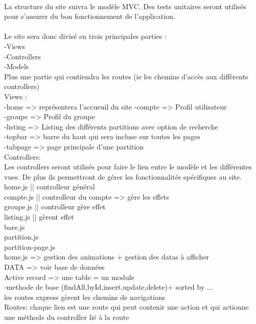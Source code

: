 \paragraph{}
La structure du site suivra le modèle MVC.
Des tests unitaires seront utilisés pour s'assurer du bon fonctionnement de l'application.
\\
\\
Le site sera donc divisé en trois principales parties : \\
-Views \\
-Controllers \\ 
-Models \\
Plus une partie qui contiendra les routes (ie les chemins d'accès aux différents controllers)
\\

Views : \\ 
-home => représentera l'accueuil du site
-compte => Profil utilisateur \\
-groupe => Profil du groupe \\
-listing => Listing des différents partitions avec option de recherche\\
-topbar => barre du haut qui sera incluse sur toutes les pages\\
-tabpage => page principale d'une partition\\

Controllers: \\
Les controllers seront utilisés pour faire le lien entre le modèle et les différentes vues. De plus ils permettront de gérer les fonctionnalités spécifiques au site. \\
home.js || controlleur général \\
compte.js || controlleur du compte => gère les effets \\
groupe.js || controlleur gère effet \\
listing.js || gèrent effet \\
bare.js \\
partition.js \\
partition-page.js \\


home.js => gestion des animations + gestion des datas à afficher \\



DATA => voir base de données \\
Active record => une table = un module \\
-methode de base (findAll,byId,insert,update,delete)+ sorted by ...  \\

les routes express gèrent les chemins de navigations  \\


Routes:
chaque lien est une route qui peut contenir une action et qui actionne une méthode du controller lié à la route \\
